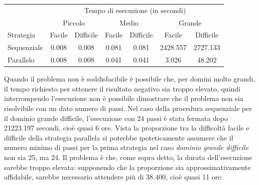 \documentclass[a4paper,oneside,12pt]{book}
\begin{document}
    \begin{center}
        \begin{tabular}{l c c c c c c}
            \toprule %
            &\multicolumn{6}{c}{Tempo di esecuzione (in secondi)} \\
            \cmidrule(l){2-7}
            & \multicolumn{2}{c}{Piccolo} & \multicolumn{2}{c}{Medio} & \multicolumn{2}{c}{Grande} \\
            \cmidrule(l){2-7}
            Strategia & Facile & Difficile & Facile & Difficile & Facile & Difficile\\
            \midrule
            Sequenziale & 0.008 & 0.008 & 0.081 & 0.081 & 2428.557  & 2727.133 \\ %
            Parallelo   & 0.008 & 0.008 & 0.041 & 0.041 & 3.026     & 48.202\\ %

            \bottomrule
        \end{tabular}
    \end{center}
    Quando il problema non è soddisfacibile è possibile che, per domini molto grandi, il tempo richiesto
    per ottenere il risultato negativo sia troppo elevato, quindi interrompendo l'esecuzione non è possibile dimostrare
    che il problema non sia risolvibile con un dato numero di passi.
    Nel caso della procedura sequenziale per il dominio grande difficile, l'esecuzione con 24 passi è stata fermata
    dopo 21223.197 secondi, cioè quasi 6 ore.
    Vista la proporzione tra la difficoltà facile e difficile della strategia parallela si potrebbe ipoteticamente
    assumere che il numero minimo di passi per la prima strategia nel caso \textit{dominio grande difficile} non sia 25,
    ma 24.
    Il problema è che, come sopra detto, la durata dell'esecuzione sarebbe troppo elevata: supponendo che la proporzione
    sia approssimativamente affidabile, sarebbe necessario attendere più di $38.400$, cioè quasi 11 ore.
    \newpage
\end{document}
